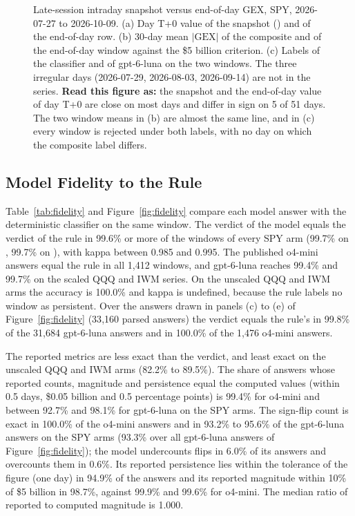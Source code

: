 \begin{figure}[H]
\centering
\resultfigure{\figIntraday}
\caption{Late-session intraday snapshot versus end-of-day GEX, SPY, 2026-07-27 to 2026-10-09. (a) Day T+0 value of the snapshot () and of the end-of-day row. (b) 30-day mean $|\mathrm{GEX}|$ of the composite and of the end-of-day window against the \$5 billion criterion. (c) Labels of the classifier and of gpt-6-luna on the two windows. The three irregular days (2026-07-29, 2026-08-03, 2026-09-14) are not in the series. \textbf{Read this figure as:} the snapshot and the end-of-day value of day T+0 are close on most days and differ in sign on 5 of 51 days. The two window means in (b) are almost the same line, and in (c) every window is rejected under both labels, with no day on which the composite label differs.}
\label{fig:intraday}
\end{figure}

\subsection{Model Fidelity to the Rule}
\label{sec:results:fidelity}

Table~\ref{tab:fidelity} and Figure~\ref{fig:fidelity} compare each model answer with the deterministic classifier on the same window.
The verdict of the model equals the verdict of the rule in 99.6\% or more of the windows of every SPY arm (99.7\% on , 99.7\% on ), with kappa between 0.985 and 0.995. The published o4-mini answers equal the rule in all 1{,}412 windows, and gpt-6-luna reaches 99.4\% and 99.7\% on the scaled QQQ and IWM series. On the unscaled QQQ and IWM arms the accuracy is 100.0\% and kappa is undefined, because the rule labels no window as persistent. Over the answers drawn in panels (c) to (e) of Figure~\ref{fig:fidelity} (33{,}160 parsed answers) the verdict equals the rule's in 99.8\% of the 31{,}684 gpt-6-luna answers and in 100.0\% of the 1{,}476 o4-mini answers.

The reported metrics are less exact than the verdict, and least exact on the unscaled QQQ and IWM arms (82.2\% to 89.5\%). The share of answers whose reported counts, magnitude and persistence equal the computed values (within 0.5 days, \$0.05 billion and 0.5 percentage points) is 99.4\% for o4-mini and between 92.7\% and 98.1\% for gpt-6-luna on the SPY arms. The sign-flip count is exact in 100.0\% of the o4-mini answers and in 93.2\% to 95.6\% of the gpt-6-luna answers on the SPY arms (93.3\% over all gpt-6-luna answers of Figure~\ref{fig:fidelity}); the model undercounts flips in 6.0\% of its answers and overcounts them in 0.6\%. Its reported persistence lies within the tolerance of the figure (one day) in 94.9\% of the answers and its reported magnitude within 10\% of \$5 billion in 98.7\%, against 99.9\% and 99.6\% for o4-mini. The median ratio of reported to computed magnitude is 1.000.

